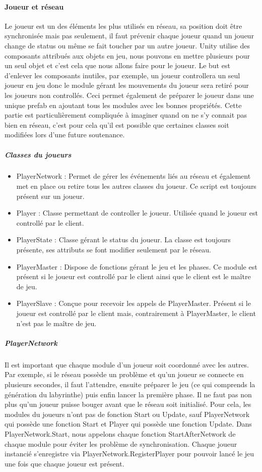 \documentclass{article}
\begin{document}
\paragraph{Joueur et réseau}

Le joueur est un des éléments les plus utilisés en réseau, sa position doit être synchronisée mais pas seulement, il faut prévenir chaque joueur quand un joueur change de status ou même se fait toucher par un autre joueur. Unity utilise des composants attribués aux objets en jeu, nous pouvons en mettre plusieurs pour un seul objet et c'est cela que nous allons faire pour le joueur. Le but est d'enlever les composants inutiles, par exemple, un joueur controllera un seul joueur en jeu donc le module gérant les mouvements du joueur sera retiré pour les joueurs non controllés. Ceci permet également de préparer le joueur dans une unique prefab en ajoutant tous les modules avec les bonnes propriétés.
Cette partie est particulièrement compliquée à imaginer quand on ne s'y connait pas bien en réseau, c'est pour cela qu'il est possible que certaines classes soit modifiées lors d'une future soutenance.

\subparagraph{Classes du joueurs}

\begin{itemize}
\item PlayerNetwork : Permet de gérer les événements liés au réseau et également met en place ou retire tous les autres classes du joueur. Ce script est toujours présent sur un joueur.
\item Player : Classe permettant de controller le joueur. Utilisée quand le joueur est controllé par le client.
\item PlayerState : Classe gérant le status du joueur. La classe est toujours présente, ses attributs se font modifier seulement par le réseau.
\item PlayerMaster : Dispose de fonctions gérant le jeu et les phases. Ce module est présent si le joueur est controllé par le client ainsi que le client est le maître de jeu.
\item PlayerSlave : Conçue pour recevoir les appels de PlayerMaster. Présent si le joueur est controllé par le client mais, contrairement à PlayerMaster, le client n'est pas le maître de jeu.
\end{itemize}

\subparagraph{PlayerNetwork}

Il est important que chaque module d'un joueur soit coordonné avec les autres. Par exemple, si le réseau possède un problème et qu'un joueur se connecte en plusieurs secondes, il faut l'attendre, ensuite préparer le jeu (ce qui comprends la génération du labyrinthe) puis enfin lancer la première phase. Il ne faut pas non plus qu'un joueur puisse bouger avant que le réseau soit initialisé.
Pour cela, les modules du joueurs n'ont pas de fonction Start ou Update, sauf PlayerNetwork qui possède une fonction Start et Player qui possède une fonction Update. Dans PlayerNetwork.Start, nous appelons chaque fonction StartAfterNetwork de chaque module pour éviter les problème de synchronisation.
Chaque joueur instancié s'enregistre via PlayerNetwork.RegisterPlayer pour pouvoir lancé le jeu une fois que chaque joueur est présent.
\end{document}
